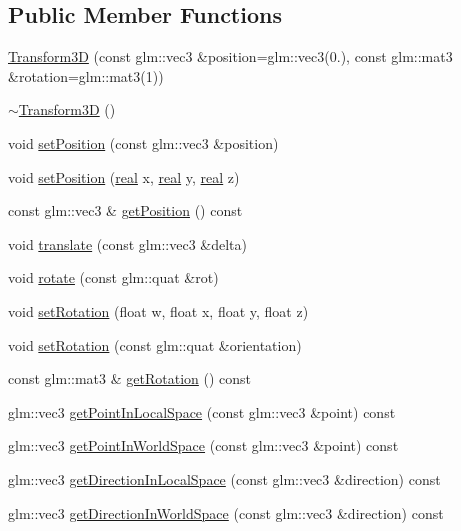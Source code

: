 \subsection*{Public Member Functions}
\begin{DoxyCompactItemize}
\item 
\mbox{\hyperlink{classr3_1_1_transform3_d_ab43888860ef5d5c124e185124cc681b5}{Transform3D}} (const glm\+::vec3 \&position=glm\+::vec3(0.), const glm\+::mat3 \&rotation=glm\+::mat3(1))
\item 
\mbox{\hyperlink{classr3_1_1_transform3_d_acb2850307abbb9733d259dba96d5ec30}{$\sim$\+Transform3D}} ()
\item 
void \mbox{\hyperlink{classr3_1_1_transform3_d_a24bf42a0f16e38b66bd6a3ecf4f026c4}{set\+Position}} (const glm\+::vec3 \&position)
\item 
void \mbox{\hyperlink{classr3_1_1_transform3_d_adae3a3bf01667c1c6c67d9a817d03a77}{set\+Position}} (\mbox{\hyperlink{namespacer3_ab2016b3e3f743fb735afce242f0dc1eb}{real}} x, \mbox{\hyperlink{namespacer3_ab2016b3e3f743fb735afce242f0dc1eb}{real}} y, \mbox{\hyperlink{namespacer3_ab2016b3e3f743fb735afce242f0dc1eb}{real}} z)
\item 
const glm\+::vec3 \& \mbox{\hyperlink{classr3_1_1_transform3_d_abe9ff86c845d54cd297ff00fd21aad71}{get\+Position}} () const
\item 
void \mbox{\hyperlink{classr3_1_1_transform3_d_a36ca89f7424b3efec3f2d5532c37f457}{translate}} (const glm\+::vec3 \&delta)
\item 
void \mbox{\hyperlink{classr3_1_1_transform3_d_aaf633209948d35ca4b90422614a84478}{rotate}} (const glm\+::quat \&rot)
\item 
void \mbox{\hyperlink{classr3_1_1_transform3_d_a78c34c186d255ad6dcd0adf7ce199c4e}{set\+Rotation}} (float w, float x, float y, float z)
\item 
void \mbox{\hyperlink{classr3_1_1_transform3_d_af539b9a5a73f5196515f9a55ee73be4d}{set\+Rotation}} (const glm\+::quat \&orientation)
\item 
const glm\+::mat3 \& \mbox{\hyperlink{classr3_1_1_transform3_d_a1bad817e81d93f275ac71864fae763aa}{get\+Rotation}} () const
\item 
glm\+::vec3 \mbox{\hyperlink{classr3_1_1_transform3_d_a7c6348081c8c1b4d36af89fa7fe2103d}{get\+Point\+In\+Local\+Space}} (const glm\+::vec3 \&point) const
\item 
glm\+::vec3 \mbox{\hyperlink{classr3_1_1_transform3_d_a4ecfb0e1518fbeaaa838da02402d0bd9}{get\+Point\+In\+World\+Space}} (const glm\+::vec3 \&point) const
\item 
glm\+::vec3 \mbox{\hyperlink{classr3_1_1_transform3_d_ac942055c92499597d01b309b4068917e}{get\+Direction\+In\+Local\+Space}} (const glm\+::vec3 \&direction) const
\item 
glm\+::vec3 \mbox{\hyperlink{classr3_1_1_transform3_d_a16c5747e86d579935b808a15f4804b2f}{get\+Direction\+In\+World\+Space}} (const glm\+::vec3 \&direction) const
\end{DoxyCompactItemize}


